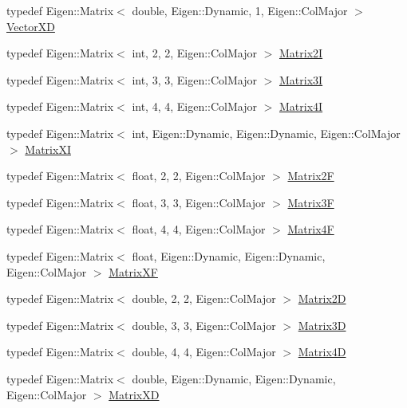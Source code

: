 \begin{DoxyCompactItemize}
\item 
typedef Eigen\+::\+Matrix$<$ double, Eigen\+::\+Dynamic, 1, Eigen\+::\+Col\+Major $>$ \mbox{\hyperlink{namespaceg2o_ab67b68e8bc395b2085174937de1a634d}{Vector\+XD}}
\item 
typedef Eigen\+::\+Matrix$<$ int, 2, 2, Eigen\+::\+Col\+Major $>$ \mbox{\hyperlink{namespaceg2o_ac9319963099ff600cf7c6251d7e937e1}{Matrix2I}}
\item 
typedef Eigen\+::\+Matrix$<$ int, 3, 3, Eigen\+::\+Col\+Major $>$ \mbox{\hyperlink{namespaceg2o_ab8a98dad54fdc966987b61b750e03201}{Matrix3I}}
\item 
typedef Eigen\+::\+Matrix$<$ int, 4, 4, Eigen\+::\+Col\+Major $>$ \mbox{\hyperlink{namespaceg2o_a10216d68ff0555e64c628cf7f5f3bb7a}{Matrix4I}}
\item 
typedef Eigen\+::\+Matrix$<$ int, Eigen\+::\+Dynamic, Eigen\+::\+Dynamic, Eigen\+::\+Col\+Major $>$ \mbox{\hyperlink{namespaceg2o_a43b1af9ed52619c66479d4820a126aef}{Matrix\+XI}}
\item 
typedef Eigen\+::\+Matrix$<$ float, 2, 2, Eigen\+::\+Col\+Major $>$ \mbox{\hyperlink{namespaceg2o_a07b62708470b4ff9ade2f9609e30310c}{Matrix2F}}
\item 
typedef Eigen\+::\+Matrix$<$ float, 3, 3, Eigen\+::\+Col\+Major $>$ \mbox{\hyperlink{namespaceg2o_aff36b18c387a854e64af640ad5cb0bd7}{Matrix3F}}
\item 
typedef Eigen\+::\+Matrix$<$ float, 4, 4, Eigen\+::\+Col\+Major $>$ \mbox{\hyperlink{namespaceg2o_afe979d0d6b88b375b29c06eb49df71fb}{Matrix4F}}
\item 
typedef Eigen\+::\+Matrix$<$ float, Eigen\+::\+Dynamic, Eigen\+::\+Dynamic, Eigen\+::\+Col\+Major $>$ \mbox{\hyperlink{namespaceg2o_a9cf1a3355d8ef3a852aa23866754758c}{Matrix\+XF}}
\item 
typedef Eigen\+::\+Matrix$<$ double, 2, 2, Eigen\+::\+Col\+Major $>$ \mbox{\hyperlink{namespaceg2o_ab45dbd73bc096222cf5688ea45b04eba}{Matrix2D}}
\item 
typedef Eigen\+::\+Matrix$<$ double, 3, 3, Eigen\+::\+Col\+Major $>$ \mbox{\hyperlink{namespaceg2o_ae968373755b3be75547f97573021dc8a}{Matrix3D}}
\item 
typedef Eigen\+::\+Matrix$<$ double, 4, 4, Eigen\+::\+Col\+Major $>$ \mbox{\hyperlink{namespaceg2o_aed3721c4efdc0f727e94569cc22ddd42}{Matrix4D}}
\item 
typedef Eigen\+::\+Matrix$<$ double, Eigen\+::\+Dynamic, Eigen\+::\+Dynamic, Eigen\+::\+Col\+Major $>$ \mbox{\hyperlink{namespaceg2o_a8a808fe01b0b4e0afe637fe680853d0a}{Matrix\+XD}}

\end{DoxyCompactItemize}
